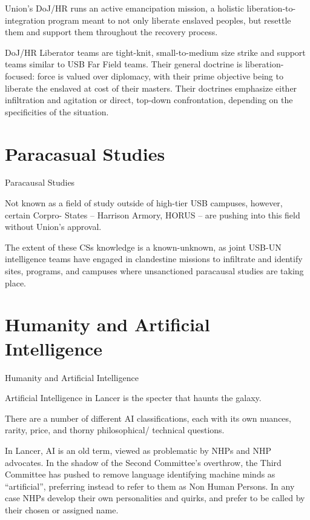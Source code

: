 Union’s DoJ/HR runs an active emancipation mission, a holistic liberation-to-integration program
meant to not only liberate enslaved peoples, but resettle them and support them throughout the
recovery process.


DoJ/HR Liberator teams are tight-knit, small-to-medium size strike and support teams similar to
USB Far Field teams. Their general doctrine is liberation-focused: force is valued over diplomacy,
with their prime objective being to liberate the enslaved at cost of their masters. Their doctrines
emphasize either infiltration and agitation or direct, top-down confrontation, depending on the
specificities of the situation.

\section{Paracasual Studies}
Paracausal Studies

Not known as a field of study outside of high-tier USB campuses, however, certain Corpro-
States -- Harrison Armory, HORUS -- are pushing into this field without Union’s approval.





The extent of these CSs knowledge is a known-unknown, as joint USB-UN intelligence teams
have engaged in clandestine missions to infiltrate and identify sites, programs, and campuses
where unsanctioned paracausal studies are taking place.

\section{Humanity and Artificial Intelligence}

Humanity and Artificial Intelligence

Artificial Intelligence in Lancer is the specter that haunts the galaxy.


There are a number of different AI classifications, each with its own nuances, rarity, price, and
thorny philosophical/ technical questions.


In Lancer, AI is an old term, viewed as problematic by NHPs and NHP advocates. In the shadow
of the Second Committee’s overthrow, the Third Committee has pushed to remove language
identifying machine minds as “artificial”, preferring instead to refer to them as Non Human
Persons. In any case NHPs develop their own personalities and quirks, and prefer to be called by
their chosen or assigned name.



